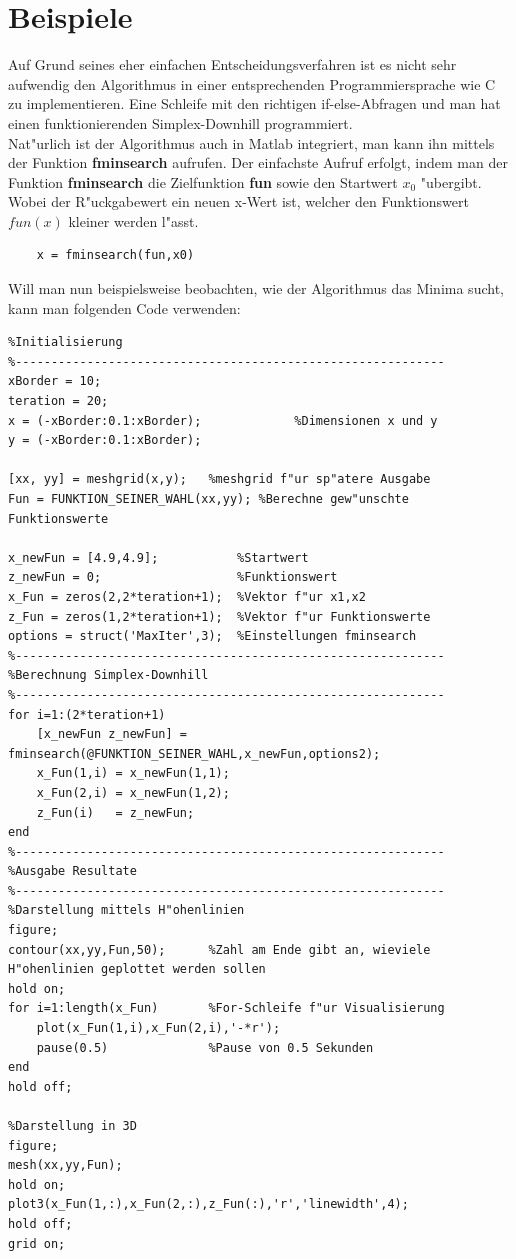 \section{Beispiele}
Auf Grund seines eher einfachen Entscheidungsverfahren ist es nicht sehr aufwendig den Algorithmus in einer entsprechenden Programmiersprache wie C zu implementieren. Eine Schleife mit den richtigen if-else-Abfragen und man hat einen funktionierenden Simplex-Downhill programmiert.\\
Nat"urlich ist der Algorithmus auch in Matlab integriert, man kann ihn mittels der Funktion \textbf{fminsearch} aufrufen. 
Der einfachste Aufruf erfolgt, indem man der Funktion \textbf{fminsearch} die Zielfunktion \textbf{fun} sowie den Startwert \textbf{$x_0$} "ubergibt. Wobei der R"uckgabewert ein neuen x-Wert ist, welcher den Funktionswert $fun(x)$ kleiner werden l"asst. 
\begin{lstlisting}
	x = fminsearch(fun,x0)
\end{lstlisting} 
Will man nun beispielsweise beobachten, wie der Algorithmus das Minima sucht, kann man folgenden Code verwenden: 
\begin{lstlisting}[style=Matlab]
%------------------------------------------------------------
%Initialisierung
%------------------------------------------------------------
xBorder = 10; 
teration = 20; 
x = (-xBorder:0.1:xBorder);				%Dimensionen x und y
y = (-xBorder:0.1:xBorder); 

[xx, yy] = meshgrid(x,y);	%meshgrid f"ur sp"atere Ausgabe
Fun = FUNKTION_SEINER_WAHL(xx,yy); %Berechne gew"unschte Funktionswerte

x_newFun = [4.9,4.9];			%Startwert
z_newFun = 0; 					%Funktionswert
x_Fun = zeros(2,2*teration+1); 	%Vektor f"ur x1,x2
z_Fun = zeros(1,2*teration+1);	%Vektor f"ur Funktionswerte
options = struct('MaxIter',3);	%Einstellungen fminsearch
%------------------------------------------------------------
%Berechnung Simplex-Downhill
%------------------------------------------------------------
for i=1:(2*teration+1)
	[x_newFun z_newFun] = fminsearch(@FUNKTION_SEINER_WAHL,x_newFun,options2);
	x_Fun(1,i) = x_newFun(1,1);
	x_Fun(2,i) = x_newFun(1,2); 
	z_Fun(i)   = z_newFun; 
end
%------------------------------------------------------------
%Ausgabe Resultate
%------------------------------------------------------------
%Darstellung mittels H"ohenlinien
figure; 
contour(xx,yy,Fun,50); 		%Zahl am Ende gibt an, wieviele H"ohenlinien geplottet werden sollen
hold on; 
for i=1:length(x_Fun)		%For-Schleife f"ur Visualisierung
    plot(x_Fun(1,i),x_Fun(2,i),'-*r'); 
    pause(0.5)				%Pause von 0.5 Sekunden
end
hold off; 

%Darstellung in 3D
figure; 
mesh(xx,yy,Fun);
hold on; 
plot3(x_Fun(1,:),x_Fun(2,:),z_Fun(:),'r','linewidth',4); 
hold off; 
grid on; 
\end{lstlisting}
